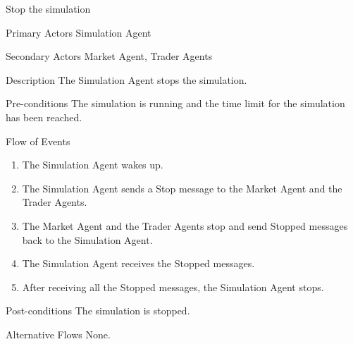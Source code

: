 \begin{usecase}{Stop the simulation}
\item[Primary Actors] Simulation Agent
\item[Secondary Actors] Market Agent, Trader Agents
\item[Description] The Simulation Agent stops the simulation.
\item[Pre-conditions] The simulation is running and the time limit for the simulation has been reached.
\item[Flow of Events] 
\begin{enumerate}
\item The Simulation Agent wakes up.
\item The Simulation Agent sends a Stop message to the Market Agent and the Trader Agents.
\item The Market Agent and the Trader Agents stop and send Stopped messages back to the Simulation Agent.
\item The Simulation Agent receives the Stopped messages.
\item After receiving all the Stopped messages, the Simulation Agent stops.
\end{enumerate}
\item[Post-conditions] The simulation is stopped.
\item[Alternative Flows] None. 
\end{usecase}

